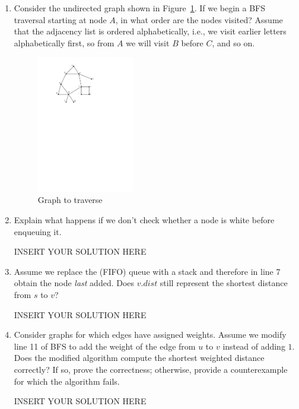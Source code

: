 \begin{enumerate}
    \item Consider the undirected graph shown in Figure~\ref{fig:box}.
    If we begin a BFS traversal starting at node $A$, in what order are the nodes visited? Assume that the adjacency list is ordered alphabetically, i.e., we visit earlier letters alphabetically first, so from $A$ we will visit $B$ before $C$, and so on.
    
    \begin{figure}[h]
        \centering
        \includegraphics[width=0.4\textwidth]{images/BFS.pdf}
        \caption{Graph to traverse}
        \label{fig:box}
    \end{figure}
    
\begin{solution}

\end{solution}
\item Explain what happens if we don't check whether a node is white before enqueuing it.
\begin{solution}   INSERT YOUR SOLUTION HERE   \end{solution}

    \item Assume we replace the (FIFO) queue with a stack and therefore in line 7 obtain the node \emph{last} added. Does $v.dist$ still represent the shortest distance from $s$ to $v$?
\begin{solution}   INSERT YOUR SOLUTION HERE   \end{solution}

    \item Consider graphs for which edges have assigned weights. Assume we modify line 11 of BFS to add the weight of the edge from $u$ to $v$ instead of adding $1$. Does the modified algorithm compute the shortest weighted distance correctly? If so, prove the correctness; otherwise, provide a counterexample for which the algorithm fails.
\begin{solution}   INSERT YOUR SOLUTION HERE   \end{solution}
    
\end{enumerate}
\newpage
